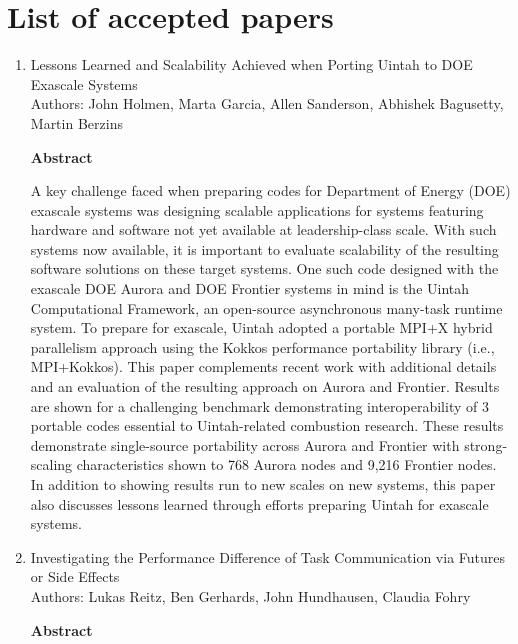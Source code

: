 \documentclass{article}
\begin{document}
\section{List of accepted papers}


\begin{enumerate}
    \item Lessons Learned and Scalability Achieved when Porting Uintah to DOE Exascale Systems \\
    Authors: John Holmen, Marta Garcia, Allen Sanderson, Abhishek Bagusetty, Martin Berzins
    \begin{center}
        \textbf{Abstract}
    \end{center}
A key challenge faced when preparing codes for Department of Energy (DOE) exascale systems was designing scalable applications for systems featuring hardware and software not yet available at leadership-class scale. With such systems now available, it is important to evaluate scalability of the resulting software solutions on these target systems. One such code designed with the exascale DOE Aurora and DOE Frontier systems in mind is the Uintah Computational Framework, an open-source asynchronous many-task runtime system. To prepare for exascale, Uintah adopted a portable MPI+X hybrid parallelism approach using the Kokkos performance portability library (i.e., MPI+Kokkos). This paper complements recent work with additional details and an evaluation of the resulting approach on Aurora and Frontier. Results are shown for a challenging benchmark demonstrating interoperability of 3 portable codes essential to Uintah-related combustion research. These results demonstrate single-source portability across Aurora and Frontier with strong-scaling characteristics shown to 768 Aurora nodes and 9,216 Frontier nodes. In addition to showing results run to new scales on new systems, this paper also discusses lessons learned through efforts preparing Uintah for exascale systems.
    \item Investigating the Performance Difference of Task Communication via Futures or Side Effects \\
    Authors: Lukas Reitz, Ben Gerhards, John Hundhausen, Claudia Fohry
    \begin{center}
        \textbf{Abstract}
    \end{center}

\end{enumerate}
\end{document}
